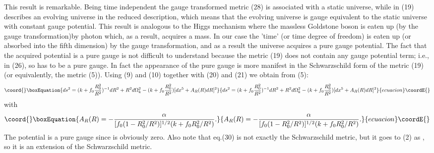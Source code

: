 \documentclass[a4paper,12pt]{article}
\begin{document}
This result is remarkable. Being time independent the gauge
transformed metric (28) is associated with a static universe,
while \coordHE{} in (19) describes an evolving universe in the reduced
description, which means that the evolving universe is gauge
equivalent to the static universe with constant gauge potential.
This result is analogous to the Higgs mechanism where the massless
Goldstone boson is eaten up (by the gauge transformation)by photon
which, as a result, acquires a mass. In our case the 'time' (or
time degree of freedom) is eaten up (or absorbed into the fifth
dimension) by the gauge transformation, and as a result the
universe acquires a pure gauge potential. The fact that the
acquired potential is a pure gauge is not difficult to understand
because the metric (19) does not contain any gauge potential term;
i.e., \coordHE{} in (26), so
\coordHE{} has to be a pure gauge.
In fact the appearance of the pure gauge is more manifest in the
Schwarzschild form of the metric (19)(or equivalently, the metric
(5)). Using (9) and (10) together with (20) and (21) we obtain
from (5):
\begin{equation}\coord{}\boxEquation{
ds^2=(k +f_0\frac{R^2_0}{R^2})^{-1}dR^2 + R^2d\Omega^2_k
-(k+f_0\frac{R^2_0}{R^2})[dx^5 +A_R(R)dR]^2
}{
ds^2=(k +f_0\frac{R^2_0}{R^2})^{-1}dR^2 + R^2d\Omega^2_k
-(k+f_0\frac{R^2_0}{R^2})[dx^5 +A_R(R)dR]^2
}{ecuacion}\coordE{}\end{equation}
with
\begin{equation}\coord{}\boxEquation{
A_R (R)=-\frac{\alpha}{[f_0(1-R^2_0/R^2)]^{1/2}(k+f_0 R^2_0/R^2)}.
}{
A_R (R)=-\frac{\alpha}{[f_0(1-R^2_0/R^2)]^{1/2}(k+f_0 R^2_0/R^2)}.
}{ecuacion}\coordE{}\end{equation}
The potential \coordHE{} is a pure gauge since
\coordHE{} is obviously
zero. Also note that eq.(30) is not exactly the Schwarzschild
metric, but it goes to (2) as \coordHE{}, so it is an
extension of the Schwarzschild metric.
\end{document}

